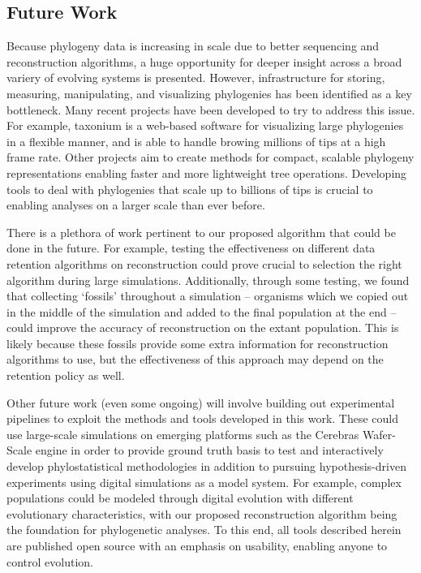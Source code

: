 \subsection{Future Work} \label{sec:conclusion:future}

Because phylogeny data is increasing in scale due to better sequencing and reconstruction algorithms, a huge opportunity for deeper insight across a broad variery of evolving systems is presented. 
However, infrastructure for storing, measuring, manipulating, and visualizing phylogenies has been identified as a key bottleneck. 
Many recent projects have been developed to try to address this issue. 
For example, taxonium \citep{sanderson2022taxonium} is a web-based software for visualizing large phylogenies in a flexible manner, and is able to handle browing millions of tips at a high frame rate. 
Other projects aim to create methods for compact, scalable phylogeny representations \citep{moshiri2025compacttree, moshiri2020treeswift} enabling faster and more lightweight tree operations. 
Developing tools to deal with phylogenies that scale up to billions of tips is crucial to enabling analyses on a larger scale than ever before.

There is a plethora of work pertinent to our proposed algorithm that could be done in the future. For example, testing the effectiveness on different data retention algorithms on reconstruction could prove crucial to selection the right algorithm during large simulations. 
Additionally, through some testing, we found that collecting `fossils' throughout a simulation -- organisms which we copied out in the middle of the simulation and added to the final population at the end -- could improve the accuracy of reconstruction on the extant population. 
This is likely because these fossils provide some extra information for reconstruction algorithms to use, but the effectiveness of this approach may depend on the retention policy as well.

Other future work (even some ongoing) will involve building out experimental pipelines to exploit the methods and tools developed in this work.
These could use large-scale simulations on emerging platforms such as the Cerebras Wafer-Scale engine in order to provide ground truth basis to test and interactively develop phylostatistical methodologies in addition to pursuing hypothesis-driven experiments using digital simulations as a model system.
For example, complex populations could be modeled through digital evolution with different evolutionary characteristics, with our proposed reconstruction algorithm being the foundation for phylogenetic analyses. 
To this end, all tools described herein are published open source \citep{moreno2024hstrat} with an emphasis on usability, enabling anyone to control evolution.
